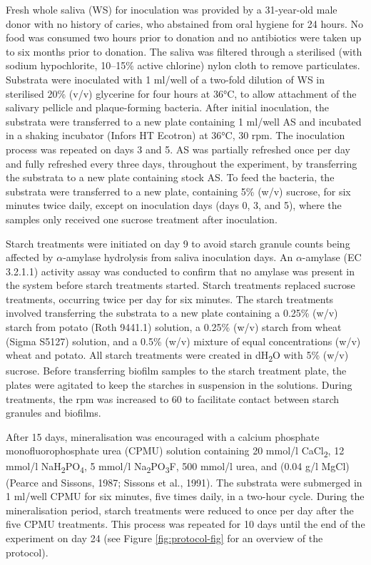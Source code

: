 \documentclass[utf8]{frontiers/frontiersSCNS}
\begin{document}
Fresh whole saliva (WS) for inoculation was provided by a 31-year-old male donor
with no history of caries, who abstained from oral hygiene for 24 hours. No
food was consumed two hours prior to donation and no antibiotics were taken up
to six months prior to donation.
The saliva was filtered through a sterilised (with sodium hypochlorite, 10--15\% active chlorine)
nylon cloth to remove particulates.
Substrata were inoculated with 1 ml/well of a two-fold dilution of WS in sterilised
20\% (v/v) glycerine for four hours at 36°C, to allow attachment of the
salivary pellicle and plaque-forming bacteria. After initial inoculation, the
substrata were transferred to a new plate containing 1 ml/well AS and incubated
in a shaking incubator (Infors HT Ecotron) at 36°C, 30 rpm.
The inoculation process was repeated on days 3 and 5.
AS was partially refreshed once per day and fully refreshed every three days,
throughout the experiment, by transferring the substrata to a new plate containing
stock AS. To feed the bacteria, the substrata were transferred to a new plate, containing
5\% (w/v) sucrose, for six minutes twice daily, except on inoculation days
(days 0, 3, and 5), where the samples only received one sucrose treatment after
inoculation.

Starch treatments were initiated on day 9 to avoid starch granule counts being
affected by \(\alpha\)-amylase hydrolysis from saliva inoculation days.
An \(\alpha\)-amylase (EC 3.2.1.1) activity
assay was conducted to confirm that no amylase was present in the system before
starch treatments started. Starch treatments replaced sucrose treatments, occurring twice per day
for six minutes. The starch treatments involved transferring the substrata to a
new plate containing a 0.25\% (w/v) starch from potato (Roth 9441.1) solution, a 0.25\% (w/v) starch from wheat (Sigma S5127) solution, and a 0.5\% (w/v) mixture of equal
concentrations (w/v) wheat and potato. All starch treatments were created in dH\textsubscript{2}O
with 5\% (w/v) sucrose. Before transferring biofilm samples to the starch treatment
plate, the plates were agitated to keep the starches in suspension in the
solutions. During treatments, the rpm was increased to 60 to facilitate contact
between starch granules and biofilms.

After 15 days, mineralisation was encouraged with a
calcium phosphate monofluorophosphate urea (CPMU) solution containing
20 mmol/l CaCl\textsubscript{2}, 12 mmol/l NaH\textsubscript{2}PO\textsubscript{4}, 5 mmol/l Na\textsubscript{2}PO\textsubscript{3}F, 500 mmol/l urea,
and (0.04 g/l MgCl)
(Pearce and Sissons, 1987; Sissons et al., 1991).
The substrata were submerged in 1 ml/well CPMU for six minutes, five times
daily, in a two-hour cycle. During the mineralisation period, starch treatments
were reduced to once per day after the five CPMU treatments. This process was repeated
for 10 days until the end of the experiment on day 24
(see Figure \ref{fig:protocol-fig} for an overview of the protocol).
\end{document}
